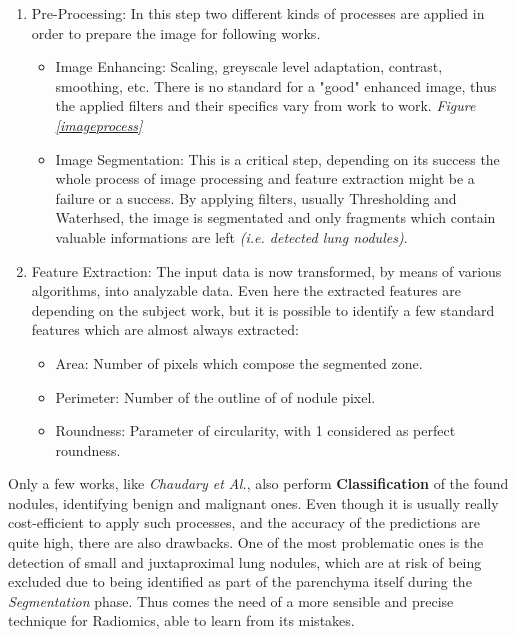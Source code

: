 \documentclass[../main.tex]{subfiles}
\begin{document}
\begin{enumerate}
	\item Pre-Processing: In this step two different kinds of processes are applied in order to prepare the image for following works.
	\begin{itemize}
		\item Image Enhancing: Scaling, greyscale level adaptation, contrast, smoothing, etc. There is no standard for a "good" enhanced image, thus the applied filters and their specifics vary from work to work. \textit{Figure \ref{imageprocess}}
		\item Image Segmentation: This is a critical step, depending on its success the whole process of image processing and feature extraction might be a failure or a success. By applying filters, usually Thresholding and Waterhsed, the image is segmentated and only fragments which contain valuable informations are left \textit{(i.e. detected lung nodules)}.
	\end{itemize}
	\item Feature Extraction: The input data is now transformed, by means of various algorithms, into analyzable data. Even here the extracted features are depending on the subject work, but it is possible to identify a few standard features which are almost always extracted:
	\begin{itemize}
		\item Area: Number of pixels which compose the segmented zone.
		\item Perimeter: Number of the outline of of nodule pixel.
		\item Roundness: Parameter of circularity, with 1 considered as perfect roundness.
	\end{itemize}
\end{enumerate}

Only a few works, like \textit{Chaudary et Al.}\cite{Chaudhary2012}, also perform \textbf{Classification} of the found nodules, identifying benign and malignant ones.
Even though it is usually really cost-efficient to apply such processes, and the accuracy of the predictions are quite high, there are also drawbacks. One of the most problematic ones is the detection of small and juxtaproximal lung nodules, which are at risk of being excluded due to being identified as part of the parenchyma itself during the \textit{Segmentation} phase. Thus comes the need of a more sensible and precise technique for Radiomics, able to learn from its mistakes. 
\end{document}
